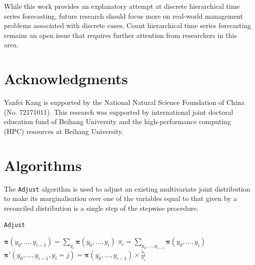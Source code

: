 \documentclass[a4paper,review,12pt,authoryear]{elsarticle}
\let\code=\texttt
\newcommand{\bpi}{\bm{\pi}}
\theoremstyle{definition}
\begin{document}
     While this work provides an explanatory attempt at discrete hierarchical time series forecasting, future research should focus more on real-world management problems associated with discrete cases. Count hierarchical time series forecasting remains an open issue that requires further attention from researchers in this area.

\section*{Acknowledgments}

Yanfei Kang is supported by the National Natural Science Foundation of China (No. 72171011). This research was supported by international joint doctoral
education fund of Beihang University and the high-performance computing (HPC) resources at Beihang University.


\begingroup
{}


\endgroup

\newpage

\appendix

\section{Algorithms}
\label{appendix:adjust}

The \code{Adjust} algorithm is used to adjust an existing multivariate joint distribution to make its marginalisation over one of the variables equal to that given by a reconciled distribution is a single step of the stepwise procedure.

\begin{algorithm}[H]
  \label{alg:adjust}
  \caption{\code{Adjust}}
  \Input{$\bpi(y_0,y_1,\dots,y_i), \tilde\pi_i, y_i \in \{0,1,\dots,k_i\}$}

  $\bpi(y_0,\dots,y_{i-1}) = \sum_{y_i}\bpi(y_0,\dots,y_i)$\;
  $\pi_i = \sum_{y_0,\dots,y_{i-1}}\bpi(y_0,\dots,y_i)$ \;
   {
    $\bpi'(y_0,\dots,y_{i-1}, y_i=j) = \bpi(y_0,\dots,y_{i-1}) \times \frac{\tilde\pi_i}{\pi_i}$ \;
  }

  \Output{$\bpi'(y_0,\dots,y_i)$}

 \end{algorithm}
\end{document}
